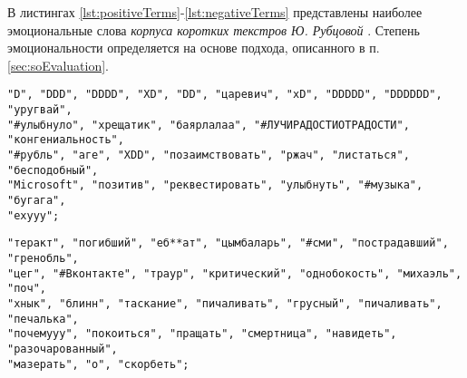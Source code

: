 

В листингах \ref{lst:positiveTerms}-\ref{lst:negativeTerms} представлены
наиболее эмоциональные слова {\it корпуса коротких текстров Ю. Рубцовой} \cite{rubtsovaCollection}.
Степень эмоциональности определяется на основе подхода, описанного в п.
\ref{sec:soEvaluation}.

\begin{lstlisting}[caption="Эмоционально положительные термы", label={lst:positiveTerms}]
"D", "DDD", "DDDD", "XD", "DD", "царевич", "xD", "DDDDD", "DDDDDD", "уругвай",
"#улыбнуло", "хрещатик", "баярлалаа", "#ЛУЧИРАДОСТИОТРАДОСТИ", "конгениальность",
"#рубль", "аге", "XDD", "позаимствовать", "ржач", "листаться", "бесподобный",
"Microsoft", "позитив", "реквестировать", "улыбнуть", "#музыка", "бугага",
"ехууу";
\end{lstlisting}

\begin{lstlisting}[caption="Эмоционально негативные термы", label={lst:negativeTerms}]
"теракт", "погибший", "еб**ат", "цымбаларь", "#сми", "пострадавший", "гренобль",
"цег", "#Вконтакте", "траур", "критический", "однобокость", "михаэль", "поч",
"хнык", "блинн", "таскание", "пичаливать", "грусный", "пичаливать", "печалька",
"почемууу", "покоиться", "пращать", "смертница", "навидеть", "разочарованный",
"мазерать", "о", "скорбеть";
\end{lstlisting}
